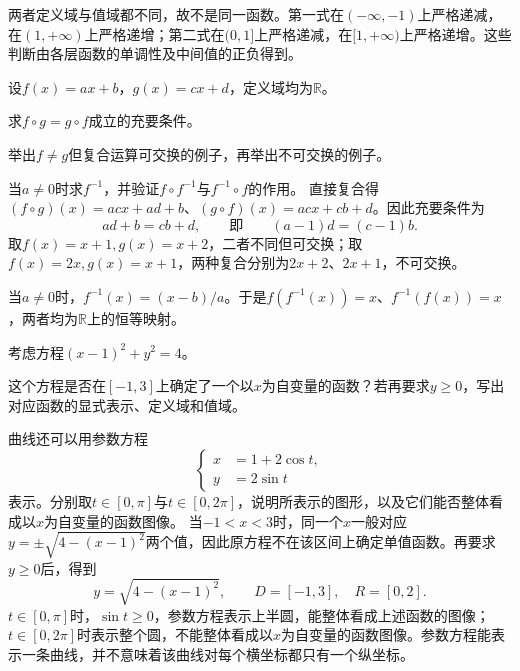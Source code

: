 两者定义域与值域都不同，故不是同一函数。第一式在\((-\infty,-1)\)上严格递减，在\((1,+\infty)\)上严格递增；第二式在\((0,1]\)上严格递减，在\([1,+\infty)\)上严格递增。这些判断由各层函数的单调性及中间值的正负得到。


设\(f(x) = a x + b\)，\(g(x) = c x + d\)，定义域均为\(\mathbb{R}\)。

\quad {}求\(f \circ g = g \circ f\)成立的充要条件。

\quad {}举出\(f \ne g\)但复合运算可交换的例子，再举出不可交换的例子。

\quad {}当\(a \ne 0\)时求\(f^{-1}\)，并验证\(f \circ f^{-1}\)与\(f^{-1} \circ f\)的作用。
\solutionanswer
{}直接复合得\((f\circ g)(x)=acx+ad+b\)、\((g\circ f)(x)=acx+cb+d\)。因此充要条件为
\[
ad+b=cb+d,\qquad\text{即}\qquad(a-1)d=(c-1)b.
\]
取\(f(x)=x+1,g(x)=x+2\)，二者不同但可交换；取\(f(x)=2x,g(x)=x+1\)，两种复合分别为\(2x+2\)、\(2x+1\)，不可交换。

当\(a\ne0\)时，\(f^{-1}(x)=(x-b)/a\)。于是\(f(f^{-1}(x))=x\)、\(f^{-1}(f(x))=x\)，两者均为\(\mathbb R\)上的恒等映射。


考虑方程\(\left( x - 1 \right)^{2} + y^{2} = 4\)。

\quad {}这个方程是否在\([-1 , 3]\)上确定了一个以\(x\)为自变量的函数？若再要求\(y \ge 0\)，写出对应函数的显式表示、定义域和值域。

\quad {}曲线还可以用参数方程
\begin{equation*}
    \left\{ \begin{aligned}
        x &= 1 + 2 \cos t , \\
        y &= 2 \sin t
    \end{aligned} \right.
\end{equation*}
表示。分别取\(t \in [0 , \pi]\)与\(t \in [0 , 2 \pi]\)，说明所表示的图形，以及它们能否整体看成以\(x\)为自变量的函数图像。
\solutionanswer
{}当\(-1<x<3\)时，同一个\(x\)一般对应\(y=\pm\sqrt{4-(x-1)^2}\)两个值，因此原方程不在该区间上确定单值函数。再要求\(y\ge0\)后，得到
\[
y=\sqrt{4-(x-1)^2},\qquad D=[-1,3],\quad R=[0,2].
\]
\(t\in[0,\pi]\)时，\(\sin t\ge0\)，参数方程表示上半圆，能整体看成上述函数的图像；\(t\in[0,2\pi]\)时表示整个圆，不能整体看成以\(x\)为自变量的函数图像。参数方程能表示一条曲线，并不意味着该曲线对每个横坐标都只有一个纵坐标。


